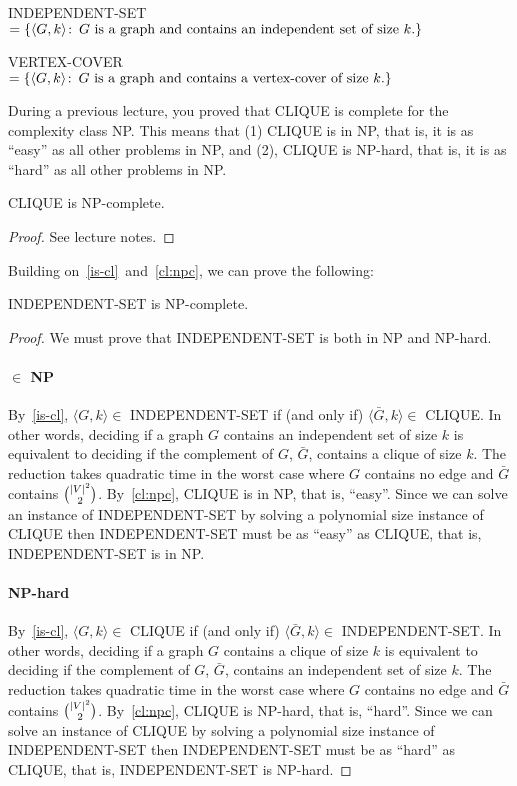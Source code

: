 \begin{definition}
  INDEPENDENT-SET $= \{\langle G,k \rangle \colon\, \text{$G$ is a graph and contains an independent set of size $k$.} \}$
\end{definition}

\begin{definition}
  VERTEX-COVER $= \{\langle G,k \rangle \colon\, \text{$G$ is a graph and contains a vertex-cover of size $k$.} \}$
\end{definition}

During a previous lecture, you proved that CLIQUE is complete for the
complexity class NP. This means that (1) CLIQUE is in NP, that is, it is as
``easy'' as all other problems in NP, and (2), CLIQUE is NP-hard,
that is, it is as ``hard'' as all other problems in NP.
\begin{theorem}\label{cl:npc}
CLIQUE is NP-complete.
\end{theorem}
\begin{proof}
  See lecture notes.
\end{proof}

Building on~\ref{is-cl}~and~\ref{cl:npc}, we can prove the following:
\begin{theorem}\label{is:npc}
INDEPENDENT-SET is NP-complete.
\end{theorem}

\begin{proof}
  We must prove that INDEPENDENT-SET is both in NP and NP-hard.
  \paragraph{$\in$ NP}
  By~\ref{is-cl}, $\langle G,k \rangle \in$ INDEPENDENT-SET if (and only if)
  $\langle \bar{G},k\rangle \in$ CLIQUE.
  In other words, deciding if a graph $G$ contains an independent set of size $k$ is
  equivalent to deciding if the complement of $G$, $\bar{G}$, contains a
  clique of size $k$. The reduction takes quadratic time in the worst
  case where $G$ contains no edge and $\bar{G}$ contains $\binom{|V|^2}{2}$.
  By~\ref{cl:npc}, CLIQUE is in NP, that is, ``easy''. Since
  we can solve an instance of INDEPENDENT-SET by solving a polynomial size instance of
  CLIQUE then INDEPENDENT-SET must be as ``easy'' as CLIQUE, that
  is, INDEPENDENT-SET is in NP.

  \paragraph{NP-hard}
  By~\ref{is-cl}, $\langle G,k \rangle \in$ CLIQUE if (and only if)
  $\langle \bar{G},k\rangle \in$ INDEPENDENT-SET.
  In other words, deciding if a graph $G$ contains a clique of size $k$ is
  equivalent to deciding if the complement of $G$, $\bar{G}$, contains an
  independent set of size $k$. The reduction takes quadratic time in the worst
  case where $G$ contains no edge and $\bar{G}$ contains $\binom{|V|^2}{2}$.
  By~\ref{cl:npc}, CLIQUE is NP-hard, that is, ``hard''. Since
  we can solve an instance of CLIQUE by solving a polynomial size instance of
  INDEPENDENT-SET then INDEPENDENT-SET must be as ``hard'' as CLIQUE, that
  is, INDEPENDENT-SET is NP-hard.
\end{proof}

